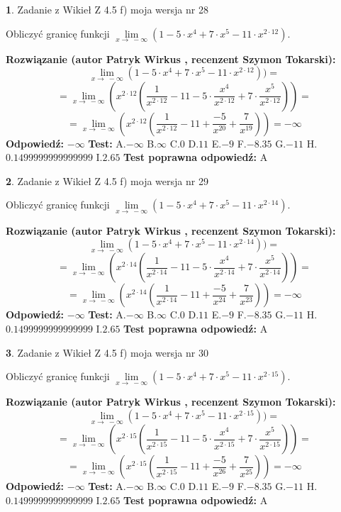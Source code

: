 \documentclass[12pt, a4paper]{article}
\theoremstyle{definition} %
\newtheorem{zad}{}
\newcommand{\zadStart}[1]{\begin{zad}#1\newline}
\newcommand{\zadStop}{\end{zad}}
\newcommand{\rozwStart}[2]{\noindent \textbf{Rozwiązanie (autor #1 , recenzent #2): }\newline}
\newcommand{\rozwStop}{\newline}
\newcommand{\odpStart}{\noindent \textbf{Odpowiedź:}\newline}
\newcommand{\odpStop}{\newline}
\newcommand{\testStart}{\noindent \textbf{Test:}\newline}
\newcommand{\testStop}{\newline}
\newcommand{\kluczStart}{\noindent \textbf{Test poprawna odpowiedź:}\newline}
\newcommand{\kluczStop}{\newline}
\begin{document}
\zadStart{Zadanie z Wikieł Z 4.5 f) moja wersja nr 28}


Obliczyć granicę funkcji  $\lim\limits_{x\to\ -\infty}(1 - 5 \cdot x^{4}+7 \cdot x^{5}- 11 \cdot x^{2\cdot12})$.
\zadStop
\rozwStart{Patryk Wirkus}{Szymon Tokarski}
$$\lim\limits_{x\to\ -\infty}(1 - 5 \cdot x^{4}+7 \cdot x^{5}- 11 \cdot x^{2\cdot12}))=$$
$$=\lim\limits_{x\to\ -\infty}(x^{2\cdot12}(\frac{1}{x^{2\cdot12}}-11 -5 \cdot \frac{x^{4}}{x^{2\cdot12}}+7 \cdot \frac{x^{5}}{x^{2\cdot12}}))=$$
$$=\lim\limits_{x\to\ -\infty}(x^{2\cdot12}(\frac{1}{x^{2\cdot12}}-11 + \frac{-5}{x^{20}}+ \frac{7}{x^{19}}))=-\infty$$
\rozwStop
\odpStart
$-\infty$
\odpStop
\testStart
A.$-\infty$ B.$\infty$ C.$0$ D.$11$ E.$-9$
F.$-8.35$ G.$-11$
H.$0.1499999999999999$
I.$2.65$
\testStop
\kluczStart
A
\kluczStop



\zadStart{Zadanie z Wikieł Z 4.5 f) moja wersja nr 29}


Obliczyć granicę funkcji  $\lim\limits_{x\to\ -\infty}(1 - 5 \cdot x^{4}+7 \cdot x^{5}- 11 \cdot x^{2\cdot14})$.
\zadStop
\rozwStart{Patryk Wirkus}{Szymon Tokarski}
$$\lim\limits_{x\to\ -\infty}(1 - 5 \cdot x^{4}+7 \cdot x^{5}- 11 \cdot x^{2\cdot14}))=$$
$$=\lim\limits_{x\to\ -\infty}(x^{2\cdot14}(\frac{1}{x^{2\cdot14}}-11 -5 \cdot \frac{x^{4}}{x^{2\cdot14}}+7 \cdot \frac{x^{5}}{x^{2\cdot14}}))=$$
$$=\lim\limits_{x\to\ -\infty}(x^{2\cdot14}(\frac{1}{x^{2\cdot14}}-11 + \frac{-5}{x^{24}}+ \frac{7}{x^{23}}))=-\infty$$
\rozwStop
\odpStart
$-\infty$
\odpStop
\testStart
A.$-\infty$ B.$\infty$ C.$0$ D.$11$ E.$-9$
F.$-8.35$ G.$-11$
H.$0.1499999999999999$
I.$2.65$
\testStop
\kluczStart
A
\kluczStop



\zadStart{Zadanie z Wikieł Z 4.5 f) moja wersja nr 30}


Obliczyć granicę funkcji  $\lim\limits_{x\to\ -\infty}(1 - 5 \cdot x^{4}+7 \cdot x^{5}- 11 \cdot x^{2\cdot15})$.
\zadStop
\rozwStart{Patryk Wirkus}{Szymon Tokarski}
$$\lim\limits_{x\to\ -\infty}(1 - 5 \cdot x^{4}+7 \cdot x^{5}- 11 \cdot x^{2\cdot15}))=$$
$$=\lim\limits_{x\to\ -\infty}(x^{2\cdot15}(\frac{1}{x^{2\cdot15}}-11 -5 \cdot \frac{x^{4}}{x^{2\cdot15}}+7 \cdot \frac{x^{5}}{x^{2\cdot15}}))=$$
$$=\lim\limits_{x\to\ -\infty}(x^{2\cdot15}(\frac{1}{x^{2\cdot15}}-11 + \frac{-5}{x^{26}}+ \frac{7}{x^{25}}))=-\infty$$
\rozwStop
\odpStart
$-\infty$
\odpStop
\testStart
A.$-\infty$ B.$\infty$ C.$0$ D.$11$ E.$-9$
F.$-8.35$ G.$-11$
H.$0.1499999999999999$
I.$2.65$
\testStop
\kluczStart
A
\kluczStop
\end{document}
